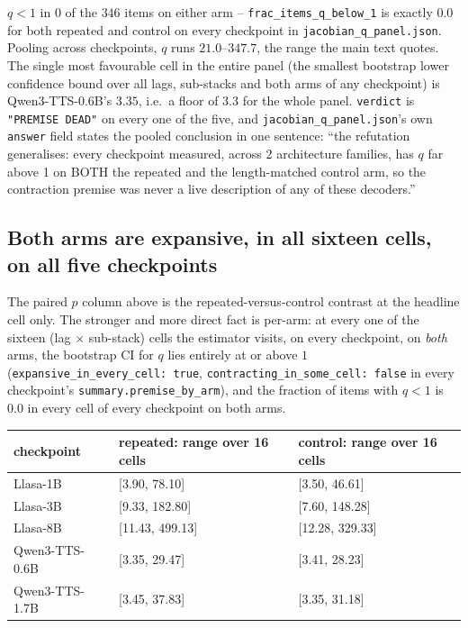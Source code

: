 \documentclass[11pt]{article}
\begin{document}
$q<1$ in $0$ of the $346$ items on either arm -- \texttt{frac\_items\_q\_below\_1}
is exactly $0.0$ for both repeated and control on every checkpoint in
\texttt{jacobian\_q\_panel.json}. Pooling across checkpoints, $q$ runs
$21.0$--$347.7$, the range the main text quotes. The single most favourable
cell in the entire panel (the smallest bootstrap lower confidence bound over
all lags, sub-stacks and both arms of any checkpoint) is Qwen3-TTS-0.6B's
$3.35$, i.e.\ a floor of $3.3$ for the whole panel. \texttt{verdict} is \texttt{"PREMISE DEAD"} on
every one of the five, and \texttt{jacobian\_q\_panel.json}'s own
\texttt{answer} field states the pooled conclusion in one sentence: ``the
refutation generalises: every checkpoint measured, across 2 architecture
families, has $q$ far above 1 on BOTH the repeated and the length-matched
control arm, so the contraction premise was never a live description of any of
these decoders.''

\subsection{Both arms are expansive, in all sixteen cells, on all five checkpoints}
\label{sec:s5-jacobian-arms}

The paired $p$ column above is the repeated-versus-control contrast at the
headline cell only. The stronger and more direct fact is per-arm: at every one
of the sixteen (lag $\times$ sub-stack) cells the estimator visits, on every
checkpoint, on \emph{both} arms, the bootstrap CI for $q$ lies entirely at or
above $1$ (\texttt{expansive\_in\_every\_cell: true},
\texttt{contracting\_in\_some\_cell: false} in every checkpoint's
\texttt{summary.premise\_by\_arm}), and the fraction of items with $q<1$ is
$0.0$ in every cell of every checkpoint on both arms.

\begin{center}
\begin{tabular}{lp{3.6cm}p{3.6cm}}
\toprule
checkpoint & repeated: range over 16 cells & control: range over 16 cells \\
\midrule
Llasa-1B & [3.90, 78.10] & [3.50, 46.61] \\
Llasa-3B & [9.33, 182.80] & [7.60, 148.28] \\
Llasa-8B & [11.43, 499.13] & [12.28, 329.33] \\
Qwen3-TTS-0.6B & [3.35, 29.47] & [3.41, 28.23] \\
Qwen3-TTS-1.7B & [3.45, 37.83] & [3.35, 31.18] \\
\bottomrule
\end{tabular}
\end{center}
\end{document}

